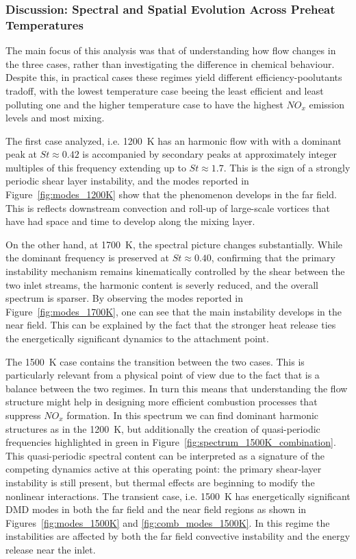 \subsubsection*{Discussion: Spectral and Spatial Evolution Across Preheat Temperatures}

The main focus of this analysis was that of understanding how flow changes in the three cases, rather than investigating the difference in chemical behaviour. Despite this, in practical cases these regimes yield different efficiency-poolutants tradoff, with the lowest temperature case beeing the least efficient and least polluting one and the higher temperature case to have the highest $NO_x$ emission levels and most mixing.

The first case analyzed, i.e. 1200~K has an harmonic flow with with a dominant peak at $St \approx 0.42$ is accompanied by secondary peaks at approximately integer multiples of this frequency extending up to $St \approx 1.7$. This is the sign of a strongly periodic shear layer instability, and the modes reported in Figure~\ref{fig:modes_1200K} show that the phenomenon develops in the far field. This is reflects downstream convection and roll-up of large-scale vortices that have had space and time to develop along the mixing layer.

On the other hand, at 1700~K, the spectral picture changes substantially. While the dominant frequency is preserved at $St \approx 0.40$, confirming that the primary instability mechanism remains kinematically controlled by the shear between the two inlet streams, the harmonic content is severly reduced, and the overall spectrum is sparser. By observing the modes reported in Figure~\ref{fig:modes_1700K}, one can see that the main instability develops in the near field. This can be explained by the fact that the stronger heat release ties the energetically significant dynamics to the  attachment point.

The 1500~K case contains the transition between the two cases. This is particularly relevant from a physical point of view due to the fact that is a balance between the two regimes. In turn this means that understanding the flow structure might help in designing more efficient combustion processes that suppress $NO_x$ formation.
In this spectrum we can find dominant harmonic structures as in the 1200~K, but additionally the creation of quasi-periodic frequencies highlighted in green in Figure~\ref{fig:spectrum_1500K_combination}. This quasi-periodic spectral content can be interpreted as a signature of the competing dynamics active at this operating point: the primary shear-layer instability is still present, but thermal effects are beginning to modify the nonlinear interactions.
The transient case, i.e. 1500~K has energetically significant DMD modes in both the far field and the near field regions as shown in Figures~\ref{fig:modes_1500K} and \ref{fig:comb_modes_1500K}. In this regime the instabilities are affected by both the far field convective instability and the energy release near the inlet.

